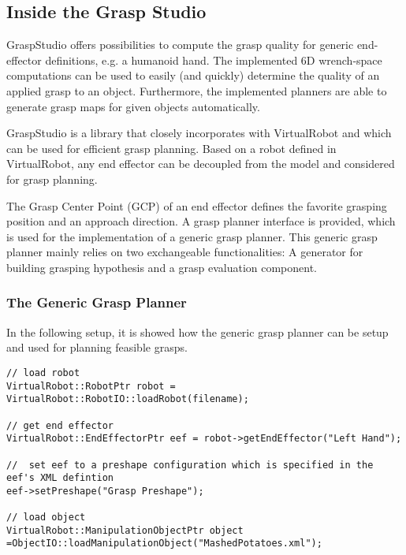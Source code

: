 \subsection{Inside the Grasp Studio}
GraspStudio offers possibilities to compute the grasp quality for generic end-effector definitions, e.g. a humanoid hand. The implemented 6D wrench-space computations can be used to easily (and quickly) determine the quality of an applied grasp to an object. Furthermore, the implemented planners are able to generate grasp maps for given objects automatically. \par GraspStudio is a library that closely incorporates with VirtualRobot and which can be used for efficient grasp planning. Based on a robot defined in VirtualRobot, any end effector can be decoupled from the model and considered for grasp planning. \par The Grasp Center Point (GCP) of an end effector defines the favorite grasping position and an approach direction. A grasp planner interface is provided, which is used for the implementation of a generic grasp planner. This generic grasp planner mainly relies on two exchangeable functionalities: A generator for building grasping hypothesis and a grasp evaluation component.

\subsubsection{The Generic Grasp Planner}
In the following setup, it is showed how the generic grasp planner can be setup and used for planning feasible grasps. 
\begin{lstlisting}
// load robot
VirtualRobot::RobotPtr robot = VirtualRobot::RobotIO::loadRobot(filename);

// get end effector
VirtualRobot::EndEffectorPtr eef = robot->getEndEffector("Left Hand");

//  set eef to a preshape configuration which is specified in the eef's XML defintion 
eef->setPreshape("Grasp Preshape");

// load object
VirtualRobot::ManipulationObjectPtr object =ObjectIO::loadManipulationObject("MashedPotatoes.xml");
\end{lstlisting}
